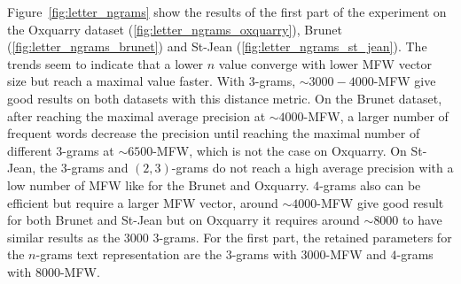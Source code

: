 Figure~\ref{fig:letter_ngrams} show the results of the first part of the experiment on the Oxquarry dataset (\ref{fig:letter_ngrams_oxquarry}), Brunet (\ref{fig:letter_ngrams_brunet}) and St-Jean (\ref{fig:letter_ngrams_st_jean}).
The trends seem to indicate that a lower $n$ value converge with lower MFW vector size but reach a maximal value faster.
With $3$-grams, $\sim 3000-4000$-MFW give good results on both datasets with this distance metric.
On the Brunet dataset, after reaching the maximal average precision at $\sim 4000$-MFW, a larger number of frequent words decrease the precision until reaching the maximal number of different $3$-grams at $\sim 6500$-MFW, which is not the case on Oxquarry.
On St-Jean, the $3$-grams and $(2,3)$-grams do not reach a high average precision with a low number of MFW like for the Brunet and Oxquarry.
$4$-grams also can be efficient but require a larger MFW vector, around $\sim 4000$-MFW give good result for both Brunet and St-Jean but on Oxquarry it requires around $\sim 8000$ to have similar results as the $3000$ $3$-grams.
For the first part, the retained parameters for the $n$-grams text representation are the $3$-grams with $3000$-MFW and $4$-grams with $8000$-MFW.

